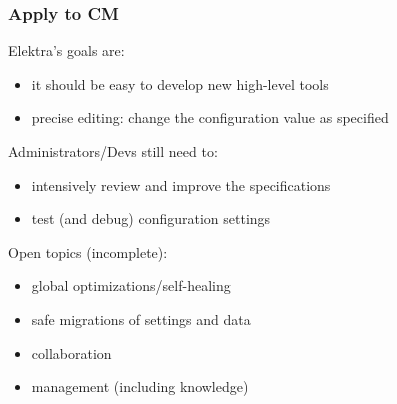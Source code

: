 \begin{frame}
	\frametitle{Apply to CM}

	Elektra's goals are:

	\begin{itemize}[<+-| alert@+>]
	\item it should be easy to develop new high-level tools
	\item precise editing: change the configuration value as specified
	\end{itemize}

	\pause[\thebeamerpauses]  %

	Administrators/Devs still need to:

	\begin{itemize}[<+-| alert@+>]
	\item intensively review and improve the specifications
	\item test (and debug) configuration settings
	\end{itemize}

	\pause[\thebeamerpauses]  %

	Open topics (incomplete):

	\begin{itemize}[<+-| alert@+>]
	\item global optimizations/self-healing
	\item safe migrations of settings and data
	\item collaboration
	\item management (including knowledge)
	\end{itemize}
\end{frame}




\nocite{raab2017introducing}

\appendix

\begin{frame}[allowframebreaks]
	
	
\end{frame}





